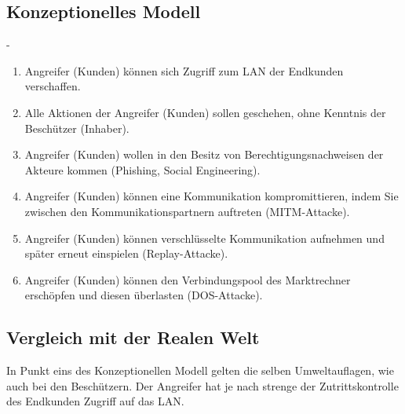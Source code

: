 \documentclass[11pt,a4paper]{report}
\begin{document}
\subsection{Konzeptionelles Modell}
-
\begin{enumerate}[leftmargin=*]
\item Angreifer (Kunden) können sich Zugriff zum LAN der Endkunden verschaffen.
\item Alle Aktionen der Angreifer (Kunden) sollen geschehen, ohne Kenntnis der Beschützer (Inhaber).
\item Angreifer (Kunden) wollen in den Besitz von Berechtigungsnachweisen der Akteure kommen (Phishing, Social Engineering).
\item Angreifer (Kunden) können eine Kommunikation kompromittieren, indem Sie zwischen den Kommunikationspartnern auftreten (MITM-Attacke).
\item Angreifer (Kunden) können verschlüsselte Kommunikation aufnehmen und später erneut einspielen (Replay-Attacke).
\item Angreifer (Kunden) können den Verbindungspool des Marktrechner erschöpfen und diesen überlasten (DOS-Attacke).
\end{enumerate}

\subsection{Vergleich mit der Realen Welt}

In Punkt eins des Konzeptionellen Modell gelten die selben Umweltauflagen, wie auch bei den Beschützern. Der Angreifer hat je nach strenge der Zutrittskontrolle des Endkunden Zugriff auf das LAN. 
\end{document}
